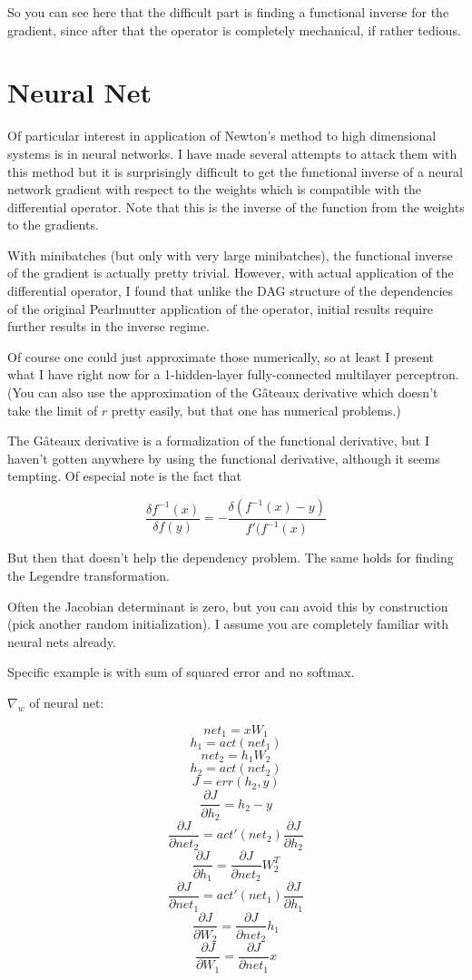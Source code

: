 \documentclass{article}
\begin{document}
So you can see here that the difficult part is finding a functional inverse for the gradient, since after that the operator is completely mechanical, if rather tedious.

\section{Neural Net}

Of particular interest in application of Newton's method to high dimensional systems is in neural networks. I have made several attempts to attack them with this method but it is surprisingly difficult to get the functional inverse of a neural network gradient with respect to the weights which is compatible with the differential operator. Note that this is the inverse of the function from the weights to the gradients.

With minibatches (but only with very large minibatches), the functional inverse of the gradient is actually pretty trivial. However, with actual application of the differential operator, I found that unlike the DAG structure of the dependencies of the original Pearlmutter application of the operator, initial results require further results in the inverse regime.

Of course one could just approximate those numerically, so at least I present what I have right now for a 1-hidden-layer fully-connected multilayer perceptron. (You can also use the approximation of the G\^{a}teaux derivative which doesn't take the limit of $r$ pretty easily, but that one has numerical problems.)

The G\^{a}teaux derivative is a formalization of the functional derivative, but I haven't gotten anywhere by using the functional derivative, although it seems tempting. Of especial note is the fact that

$$\frac{\delta f^{-1}(x)}{\delta f(y)} = - \frac{\delta(f^{-1}(x) - y)}{f'(f^{-1}(x)} $$

But then that doesn't help the dependency problem. The same holds for finding the Legendre transformation.

Often the Jacobian determinant is zero, but you can avoid this by construction (pick another random initialization). I assume you are completely familiar with neural nets already\cite{deeplearning}.

Specific example is with sum of squared error and no softmax.

$\nabla_w$ of neural net:

$$ net_1 = xW_1 $$
$$ h_1 = act(net_1) $$
$$ net_2 = h_1W_2 $$
$$ h_2 = act(net_2) $$
$$ J = err(h_2, y) $$
$$ \frac{\partial J}{\partial h_2} = h_2 - y $$
$$ \frac{\partial J}{\partial net_2} = act'(net_2)\frac{\partial J}{\partial h_2}$$
$$ \frac{\partial J}{\partial h_1} = \frac{\partial J}{\partial net_2} W_2^T$$
$$ \frac{\partial J}{\partial net_1} = act'(net_1)\frac{\partial J}{\partial h_1}$$
$$ \frac{\partial J}{\partial W_2} = \frac{\partial J}{\partial net_2} h_1$$
$$ \frac{\partial J}{\partial W_1} = \frac{\partial J}{\partial net_1} x$$
\end{document}
